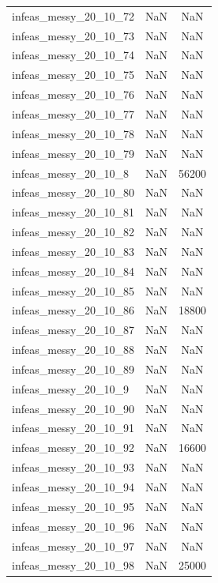 \begin{longtable}{lcc}
infeas\_messy\_20\_10\_72  &      NaN &    NaN \\
infeas\_messy\_20\_10\_73  &      NaN &    NaN \\
infeas\_messy\_20\_10\_74  &      NaN &    NaN \\
infeas\_messy\_20\_10\_75  &      NaN &    NaN \\
infeas\_messy\_20\_10\_76  &      NaN &    NaN \\
infeas\_messy\_20\_10\_77  &      NaN &    NaN \\
infeas\_messy\_20\_10\_78  &      NaN &    NaN \\
infeas\_messy\_20\_10\_79  &      NaN &    NaN \\
infeas\_messy\_20\_10\_8   &      NaN &  56200 \\
infeas\_messy\_20\_10\_80  &      NaN &    NaN \\
infeas\_messy\_20\_10\_81  &      NaN &    NaN \\
infeas\_messy\_20\_10\_82  &      NaN &    NaN \\
infeas\_messy\_20\_10\_83  &      NaN &    NaN \\
infeas\_messy\_20\_10\_84  &      NaN &    NaN \\
infeas\_messy\_20\_10\_85  &      NaN &    NaN \\
infeas\_messy\_20\_10\_86  &      NaN &  18800 \\
infeas\_messy\_20\_10\_87  &      NaN &    NaN \\
infeas\_messy\_20\_10\_88  &      NaN &    NaN \\
infeas\_messy\_20\_10\_89  &      NaN &    NaN \\
infeas\_messy\_20\_10\_9   &      NaN &    NaN \\
infeas\_messy\_20\_10\_90  &      NaN &    NaN \\
infeas\_messy\_20\_10\_91  &      NaN &    NaN \\
infeas\_messy\_20\_10\_92  &      NaN &  16600 \\
infeas\_messy\_20\_10\_93  &      NaN &    NaN \\
infeas\_messy\_20\_10\_94  &      NaN &    NaN \\
infeas\_messy\_20\_10\_95  &      NaN &    NaN \\
infeas\_messy\_20\_10\_96  &      NaN &    NaN \\
infeas\_messy\_20\_10\_97  &      NaN &    NaN \\
infeas\_messy\_20\_10\_98  &      NaN &  25000 \\

\end{longtable}
